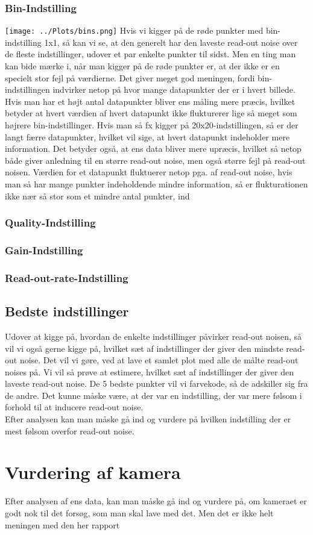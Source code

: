 \documentclass[working]{tuftebook}
\begin{document}
\subsubsection*{Bin-Indstilling}
\texttt{[image: ../Plots/bins.png]} 
Hvis vi kigger på de røde punkter med bin-indstilling 1x1, så kan vi se, at den generelt har den laveste read-out noise over de fleste indstillinger, udover et par enkelte punkter til sidst. Men en ting man kan bide mærke i, når man kigger på de røde punkter er, at der ikke er en specielt stor fejl på værdierne. Det giver meget god meningen, fordi bin-indstillingen indvirker netop på hvor mange datapunkter der er i hvert billede. Hvis man har et højt antal datapunkter bliver ens måling mere præcis, hvilket betyder at hvert værdien af hvert datapunkt ikke flukturerer lige så meget som højrere bin-indstillinger. Hvis man så fx kigger på 20x20-indstillingen, så er der langt færre datapunkter, hvilket vil sige, at hvert datapunkt indeholder mere information. Det betyder også, at ens data bliver mere upræcis, hvilket så netop både giver anledning til en større read-out noise, men også større fejl på read-out noisen. Værdien for et datapunkt fluktuerer netop pga. af read-out noise, hvis man så har mange punkter indeholdende mindre information, så er flukturationen ikke nær så stor som et mindre antal punkter, ind
\subsubsection*{Quality-Indstilling}
\subsubsection*{Gain-Indstilling}
\subsubsection*{Read-out-rate-Indstilling}
\subsection{Bedste indstillinger}
Udover at kigge på, hvordan de enkelte indstillinger påvirker read-out noisen, så  vil vi også gerne kigge på, hvilket sæt af indstillinger der giver den mindste read-out noise. Det vil vi gøre, ved at lave et samlet plot med alle de målte read-out noises på. Vi vil så prøve at estimere, hvilket sæt af indstillinger der giver den laveste read-out noise. De 5 bedste punkter vil vi farvekode, så de adskiller sig fra de andre. Det kunne måske være, at der var en indstilling, der var mere følsom i forhold til at inducere read-out noise. 
\\
Efter analysen kan man måske gå ind og vurdere på hvilken indstilling der er mest følsom overfor read-out noise. 

\section{Vurdering af kamera}
Efter analysen af ens data, kan man måske gå ind og vurdere på, om kameraet er godt nok til det forsøg, som man skal lave med det. Men det er ikke helt meningen med den her rapport
\end{document}
